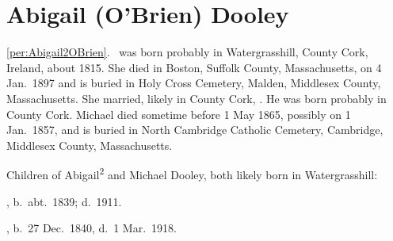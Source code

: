 \section{Abigail (O'Brien) Dooley}

\ref{per:Abigail2OBrien}.\  was born probably in Watergrasshill, County Cork, Ireland, about 1815.\cite{Census1855Abigail} She died in Boston, Suffolk County, Massachusetts, on 4 Jan.\ 1897\cite{Abigail2OBrienDeath} and is buried in Holy Cross Cemetery, Malden, Middlesex County, Massachusetts.\cite{CarolGordon} She married, likely in County Cork, .\cite{Abigail2OBrienDeath} He was born probably in County Cork.\cite{MichaelDooleyBirth} Michael died sometime before 1 May 1865,\cite{Census1865Abigail} possibly on 1 Jan.\ 1857,\cite{MichaelDooleyDeath} and is buried in North Cambridge Catholic Cemetery, Cambridge, Middlesex County, Massachusetts.\cite{DianaBerberenaLetter2}

\begin{KidsIntro}
	Children of Abigail\textsuperscript{2} and Michael Dooley, both likely born in Watergrasshill:
\end{KidsIntro}

\begin{Kids}
	, b.\ abt.\ 1839; d.\ 1911.
	
	, b.\ 27 Dec.\ 1840, d.\ 1 Mar.\ 1918.

\end{Kids}
